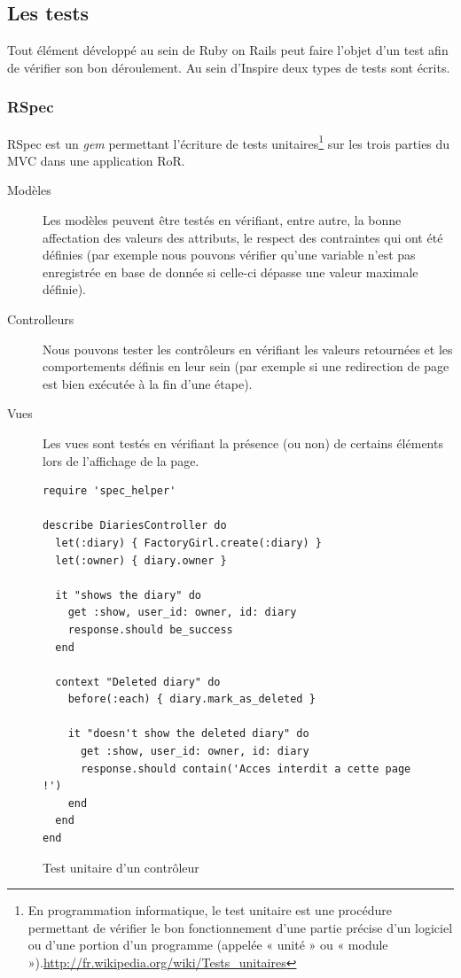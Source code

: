 \documentclass[12pt,a4paper]{book}
\begin{document}
\subsection{Les tests}

\label{sec.tests}

Tout élément développé au sein de Ruby on Rails peut faire l'objet d'un test afin de vérifier son bon déroulement. Au sein d'Inspire deux types de tests sont écrits.

\subsubsection{RSpec}

RSpec est un \textit{gem} permettant l'écriture de tests unitaires\footnote{En programmation informatique, le test unitaire est une procédure permettant de vérifier le bon fonctionnement d'une partie précise d'un logiciel ou d'une portion d'un programme (appelée « unité » ou « module »).\url{http://fr.wikipedia.org/wiki/Tests_unitaires}} sur les trois parties du MVC dans une application RoR.
\begin{description}
	\item[Modèles] Les modèles peuvent être testés en vérifiant, entre autre, la bonne affectation des valeurs des attributs, le respect des contraintes qui ont été définies (par exemple nous pouvons vérifier qu'une variable n'est pas enregistrée en base de donnée si celle-ci dépasse une valeur maximale définie).
	\item[Controlleurs] Nous pouvons tester les contrôleurs en vérifiant les valeurs retournées et les comportements définis en leur sein (par exemple si une redirection de page est bien exécutée à la fin d'une étape).
	\item[Vues] Les vues sont testés en vérifiant la présence (ou non) de certains éléments lors de l'affichage de la page. 
\end{description}

\begin{figure}[h]
\lstset{language=ruby}
\begin{lstlisting}
require 'spec_helper'

describe DiariesController do
  let(:diary) { FactoryGirl.create(:diary) }
  let(:owner) { diary.owner }

  it "shows the diary" do
    get :show, user_id: owner, id: diary
    response.should be_success
  end

  context "Deleted diary" do
    before(:each) { diary.mark_as_deleted }

    it "doesn't show the deleted diary" do
      get :show, user_id: owner, id: diary
      response.should contain('Acces interdit a cette page !')
    end
  end
end
\end{lstlisting}
 \caption{Test unitaire d'un contrôleur}
\end{figure}
\end{document}
